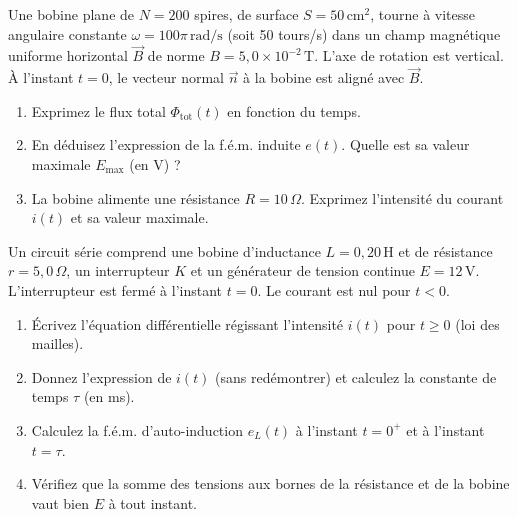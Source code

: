 \documentclass[11pt]{article}
\begin{document}
\begin{exercice}
Une bobine plane de $N = 200$ spires, de surface $S = 50\,\text{cm}^2$, tourne à vitesse angulaire constante $\omega = 100\pi\,\text{rad/s}$ (soit 50 tours/s) dans un champ magnétique uniforme horizontal $\vec{B}$ de norme $B = 5,0 \times 10^{-2}\,\text{T}$. L'axe de rotation est vertical. À l'instant $t=0$, le vecteur normal $\vec{n}$ à la bobine est aligné avec $\vec{B}$.
\begin{enumerate}
    \item Exprimez le flux total $\Phi_{\text{tot}}(t)$ en fonction du temps.
    \item En déduisez l'expression de la f.é.m. induite $e(t)$. Quelle est sa valeur maximale $E_{\text{max}}$ (en V) ?
    \item La bobine alimente une résistance $R = 10\,\Omega$. Exprimez l'intensité du courant $i(t)$ et sa valeur maximale.
\end{enumerate}
\end{exercice}

\begin{exercice}
Un circuit série comprend une bobine d'inductance $L = 0,20\,\text{H}$ et de résistance $r = 5,0\,\Omega$, un interrupteur $K$ et un générateur de tension continue $E = 12\,\text{V}$. L'interrupteur est fermé à l'instant $t=0$. Le courant est nul pour $t<0$.
\begin{enumerate}
    \item Écrivez l'équation différentielle régissant l'intensité $i(t)$ pour $t \ge 0$ (loi des mailles).
    \item Donnez l'expression de $i(t)$ (sans redémontrer) et calculez la constante de temps $\tau$ (en ms).
    \item Calculez la f.é.m. d'auto-induction $e_L(t)$ à l'instant $t = 0^+$ et à l'instant $t = \tau$.
    \item Vérifiez que la somme des tensions aux bornes de la résistance et de la bobine vaut bien $E$ à tout instant.
\end{enumerate}
\end{exercice}
\end{document}
